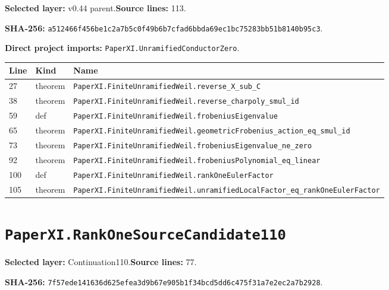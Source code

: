 \documentclass[10pt,oneside]{book}
\begin{document}
\textbf{Selected layer:} v0.44 parent.\quad\textbf{Source lines:} 113.\par\textbf{SHA-256:} {\scriptsize\nolinkurl{a512466f456be1c2a7b5c0f49b6b7cfad6bbda69ec1bc75283bb51b8140b95c3}}.


\textbf{Direct project imports:} \nolinkurl{PaperXI.UnramifiedConductorZero}.

\begin{longtable}{@{}p{}p{}p{}@{}}\toprule Line&Kind&Name\\\midrule\endhead

27&theorem&\nolinkurl{PaperXI.FiniteUnramifiedWeil.reverse_X_sub_C}\\

38&theorem&\nolinkurl{PaperXI.FiniteUnramifiedWeil.reverse_charpoly_smul_id}\\

59&def&\nolinkurl{PaperXI.FiniteUnramifiedWeil.frobeniusEigenvalue}\\

65&theorem&\nolinkurl{PaperXI.FiniteUnramifiedWeil.geometricFrobenius_action_eq_smul_id}\\

73&theorem&\nolinkurl{PaperXI.FiniteUnramifiedWeil.frobeniusEigenvalue_ne_zero}\\

92&theorem&\nolinkurl{PaperXI.FiniteUnramifiedWeil.frobeniusPolynomial_eq_linear}\\

100&def&\nolinkurl{PaperXI.FiniteUnramifiedWeil.rankOneEulerFactor}\\

105&theorem&\nolinkurl{PaperXI.FiniteUnramifiedWeil.unramifiedLocalFactor_eq_rankOneEulerFactor}\\

\bottomrule\end{longtable}

\section{\texorpdfstring{\nolinkurl{PaperXI.RankOneSourceCandidate110}}{PaperXI.RankOneSourceCandidate110}}\label{module:PaperXI.RankOneSourceCandidate110}

\textbf{Selected layer:} Continuation110.\quad\textbf{Source lines:} 77.\par\textbf{SHA-256:} {\scriptsize\nolinkurl{7f57ede141636d625efea3d9b67e905b1f34bcd5dd6c475f31a7e2ec2a7b2928}}.
\end{document}
